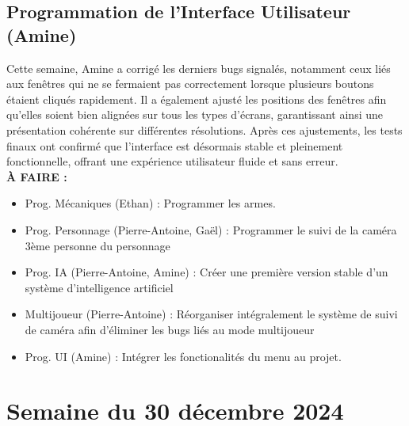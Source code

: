 \documentclass{report}
\begin{document}
\subsection*{Programmation de l'Interface Utilisateur (Amine)}
Cette semaine, Amine a corrigé les derniers bugs signalés, notamment ceux liés aux fenêtres qui ne se fermaient pas correctement lorsque plusieurs boutons étaient cliqués rapidement. Il a également ajusté les positions des fenêtres afin qu’elles soient bien alignées sur tous les types d’écrans, garantissant ainsi une présentation cohérente sur différentes résolutions. Après ces ajustements, les tests finaux ont confirmé que l’interface est désormais stable et pleinement fonctionnelle, offrant une expérience utilisateur fluide et sans erreur.
\\[1cm]
\textbf{À FAIRE :}
\begin{itemize}
    \item Prog. Mécaniques (Ethan) : Programmer les armes.
    \item Prog. Personnage (Pierre-Antoine, Gaël) : Programmer le suivi de la caméra 3ème personne du personnage
    \item Prog. IA (Pierre-Antoine, Amine) : Créer une première version stable d'un système d'intelligence artificiel
    \item Multijoueur (Pierre-Antoine) : Réorganiser intégralement le système de suivi de caméra afin d'éliminer les bugs liés au mode multijoueur
    \item Prog. UI (Amine) : Intégrer les fonctionalités du menu au projet.
\end{itemize}




\newpage
\section{Semaine du 30 décembre 2024}
\end{document}
